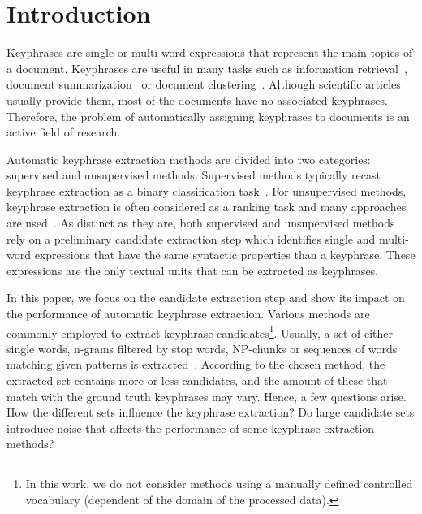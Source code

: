 \section{Introduction}
\label{sec:section}
  Keyphrases are single or multi-word expressions that represent the main topics
  of a document. Keyphrases are useful in many tasks such as information
  retrieval~\cite{medelyan2008smalltrainingset}, document
  summarization~\cite{litvak2008graphbased} or document
  clustering~\cite{han2007webdocumentclustering}. Although scientific articles
  usually provide them, most of the documents have no associated keyphrases.
  Therefore, the problem of automatically assigning keyphrases to documents is
  an active field of research.

  Automatic keyphrase extraction methods are divided into two categories:
  supervised and unsupervised methods. Supervised methods typically recast
  keyphrase extraction as a binary classification
  task~\cite{witten1999kea,sujian2003maximumentropy,eichler2010keywe}. For
  unsupervised methods, keyphrase extraction is often considered as a ranking
  task and many approaches are
  used~\cite{barker2000nounphrasehead,tomokiyo2003languagemodel,mihalcea2004textrank}.
  As distinct as they are, both supervised and unsupervised methods rely on a
  preliminary candidate extraction step which identifies single and multi-word
  expressions that have the same syntactic properties than a keyphrase. These
  expressions are the only textual units that can be extracted as keyphrases.
  
  In this paper, we focus on the candidate extraction step and show its impact
  on the performance of automatic keyphrase extraction. Various methods
  are commonly employed to extract keyphrase candidates\footnote{In this work,
  we do not consider methods using a manually defined controlled vocabulary
  (dependent of the domain of the processed data).}. Usually, a set of
  either single words, n-grams filtered by stop words, NP-chunks or sequences of
  words matching given patterns is extracted~\cite{hulth2003keywordextraction}.
  According to the chosen method, the extracted set contains more or less
  candidates, and the amount of these that match with the ground truth
  keyphrases may vary. Hence, a few questions arise. How the different sets
  influence the keyphrase extraction? Do large candidate sets introduce noise
  that affects the performance of some keyphrase extraction methods?

